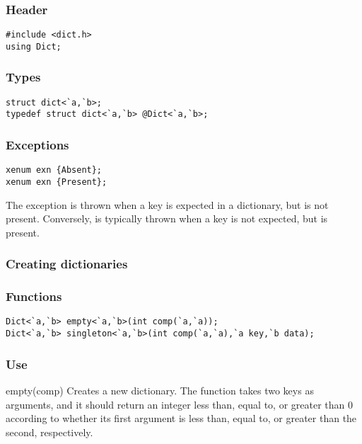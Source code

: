 \subsubsection*{Header}
\begin{verbatim}
#include <dict.h>
using Dict;
\end{verbatim}

\subsubsection*{Types}
\begin{verbatim}
struct dict<`a,`b>;
typedef struct dict<`a,`b> @Dict<`a,`b>;
\end{verbatim}

\subsubsection*{Exceptions}
\begin{verbatim}
xenum exn {Absent};
xenum exn {Present};
\end{verbatim}

The exception  is thrown when a key is expected in a
dictionary, but is not present.  Conversely,  is
typically thrown when a key is not expected, but is present.


\subsubsection*{Creating dictionaries}

\subsubsection*{Functions}
\begin{verbatim}
Dict<`a,`b> empty<`a,`b>(int comp(`a,`a));
Dict<`a,`b> singleton<`a,`b>(int comp(`a,`a),`a key,`b data);
\end{verbatim}

\subsubsection*{Use}
\begin{defun}{empty}{(comp)}
Creates a new dictionary.  The function  takes two keys as
arguments, and it should return an integer less than, equal to, or
greater than 0 according to whether its first argument is less than,
equal to, or greater than the second, respectively.
\end{defun}

